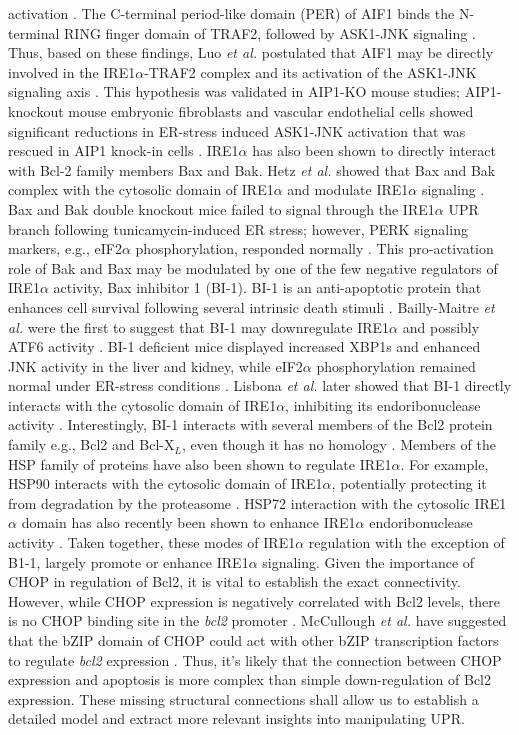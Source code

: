 \documentclass[12pt]{article}
\begin{document}
activation \citep{Luo:2008ly}. The C-terminal period-like domain (PER) of AIF1 binds the N-terminal RING finger domain of TRAF2, followed by ASK1-JNK signaling \citep{Zhang:2004ve}. Thus, based on these findings, Luo \emph{et al.} postulated that AIF1 may be directly involved in the IRE1$\alpha$-TRAF2 complex and its activation of the ASK1-JNK signaling axis \citep{Luo:2008ly}. This hypothesis was validated in AIP1-KO mouse studies; AIP1-knockout mouse embryonic fibroblasts and vascular endothelial cells showed significant reductions in ER-stress induced ASK1-JNK activation that was rescued in AIP1 knock-in cells \citep{Luo:2008ly}. IRE1$\alpha$ has also been shown to directly interact with Bcl-2 family members Bax and Bak. Hetz \emph{et al.} showed that Bax and Bak complex with the cytosolic domain of IRE1$\alpha$ and modulate IRE1$\alpha$ signaling \citep{Hetz:2006qf}. Bax and Bak double knockout mice failed to signal through the IRE1$\alpha$ UPR branch following tunicamycin-induced ER stress; however, PERK signaling markers, e.g., eIF2$\alpha$ phosphorylation, responded normally \citep{Hetz:2006qf}. This pro-activation role of Bak and Bax may be modulated by one of the few negative regulators of IRE1$\alpha$ activity, Bax inhibitor 1 (BI-1). BI-1 is an anti-apoptotic protein that enhances cell survival following several intrinsic death stimuli \citep{Xu:1998dq}. Bailly-Maitre \emph{et al.} were the first to suggest that BI-1 may downregulate IRE1$\alpha$ and possibly ATF6 activity \citep{Bailly-Maitre:2006bh}. BI-1 deficient mice displayed increased XBP1s and enhanced JNK activity in the liver and kidney, while eIF2$\alpha$ phosphorylation remained normal under ER-stress conditions \citep{Bailly-Maitre:2006bh}. Lisbona \emph{et al.} later showed that BI-1 directly interacts with the cytosolic domain of IRE1$\alpha$, inhibiting its endoribonuclease activity \citep{Lisbona:2009cr}. Interestingly, BI-1 interacts with several members of the Bcl2 protein family e.g., Bcl2 and Bcl-X$_{L}$, even though it has no homology \citep{Xu:1998dq}. Members of the HSP family of proteins have also been shown to regulate IRE1$\alpha$. For example, HSP90 interacts with the cytosolic domain of IRE1$\alpha$, potentially protecting it from degradation by the proteasome \citep{Marcu:2002oq}. HSP72 interaction with the cytosolic IRE1$\alpha$ domain has also recently been shown to enhance IRE1$\alpha$ endoribonuclease activity \citep{Gupta:2010kl}. Taken together, these modes of IRE1$\alpha$ regulation with the exception of B1-1, largely promote or enhance IRE1$\alpha$ signaling. Given the importance of CHOP in regulation of Bcl2, it is vital to establish the exact connectivity. However, while CHOP expression is negatively correlated with Bcl2 levels, there is no CHOP binding site in the \emph{bcl2} promoter \citep{mccullough2001gsc}. McCullough \emph{et al.} have suggested that the bZIP domain of CHOP could act with other bZIP transcription factors to regulate \emph{bcl2} expression \citep{mccullough2001gsc}. Thus, it's likely that the connection between CHOP expression and apoptosis is more complex than simple down-regulation of Bcl2 expression. These missing structural connections shall allow us to establish a detailed model and extract more relevant insights into manipulating UPR. 


\clearpage
% 


\end{document}
